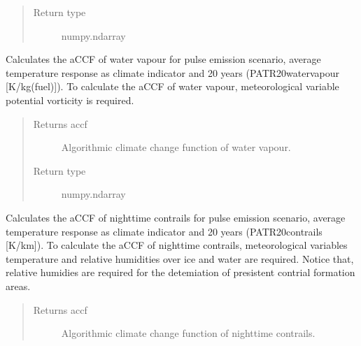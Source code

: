 \documentclass[a4paper,11pt,english]{sphinxmanual}
\begin{document}
\begin{fulllineitems}
\begin{fulllineitems}
\begin{quote}
\begin{description}
\item[{Return type}] \leavevmode
numpy.ndarray

\end{description}\end{quote}

\end{fulllineitems}


\begin{fulllineitems}
\label{\detokenize{envlib:envlib.accf.CalAccf.accf_h2o}}
Calculates the aCCF of water vapour for pulse emission scenario, average temperature response as
climate indicator and 20 years (P\sphinxhyphen{}ATR20\sphinxhyphen{}water\sphinxhyphen{}vapour {[}K/kg(fuel){]}). To calculate the aCCF of water vapour,
meteorological variable potential vorticity is required.
\begin{quote}\begin{description}
\item[{Returns accf}] \leavevmode
Algorithmic climate change function of water vapour.

\item[{Return type}] \leavevmode
numpy.ndarray

\end{description}\end{quote}

\end{fulllineitems}


\begin{fulllineitems}
\label{\detokenize{envlib:envlib.accf.CalAccf.accf_ncontrail}}
Calculates the aCCF of night\sphinxhyphen{}time contrails for pulse emission scenario, average temperature response as
climate indicator and 20 years (P\sphinxhyphen{}ATR20\sphinxhyphen{}contrails {[}K/km{]}). To calculate the aCCF of nighttime contrails,
meteorological variables temperature and relative humidities over ice and water are required. Notice that,
relative humidies are required for the detemiation of presistent contrial formation areas.
\begin{quote}\begin{description}
\item[{Returns accf}] \leavevmode
Algorithmic climate change function of nighttime contrails.


\end{description}
\end{quote}
\end{fulllineitems}
\end{fulllineitems}
\end{document}
